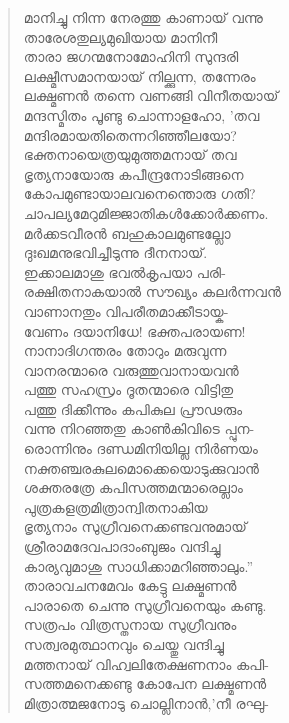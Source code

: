 \begin{verse}
മാനിച്ചു നിന്ന നേരത്തു കാണായ് വന്നു\\
താരേശതുല്യമുഖിയായ മാനിനീ\\
താരാ ജഗന്മനോമോഹിനി സുന്ദരി\\
ലക്ഷ്മീസമാനയായ് നില്ക്കുന്ന, തന്നേരം\\
ലക്ഷ്മണന്‍ തന്നെ വണങ്ങി വിനീതയായ്\\
മന്ദസ്മിതം പൂണ്ടു ചൊന്നാളഹോ, ’തവ\\
മന്ദിരമായതിതെന്നറിഞ്ഞീലയോ?\\
ഭക്തനായെത്രയുമുത്തമനായ് തവ\\
ഭൃത്യനായോരു കപീന്ദ്രനോടിങ്ങനെ\\
കോപമുണ്ടായാലവനെന്തൊരു ഗതി?\\
ചാപല്യമേറുമിജ്ജാതികള്‍ക്കോര്‍ക്കണം.\\
മര്‍ക്കടവീരന്‍ ബഹുകാലമുണ്ടല്ലോ\\
ദുഃഖമനുഭവിച്ചീടുന്നു ദീനനായ്.\\
ഇക്കാലമാശു ഭവല്‍കൃപയാ പരി-\\
രക്ഷിതനാകയാല്‍ സൗഖ്യം കലര്‍ന്നവന്‍\\
വാണാനതും വിപരീതമാക്കീടായ്ക-\\
വേണം ദയാനിധേ! ഭക്തപരായണ!\\
നാനാദിഗന്തരം തോറും മരുവുന്ന\\
വാനരന്മാരെ വരുത്തുവാനായവന്‍\\
പത്തു സഹസ്രം ദൂതന്മാരെ വിട്ടിതു\\
പത്തു ദിക്കീന്നും കപികുല പ്രൗഢരും\\
വന്നു നിറഞ്ഞതു കാണ്‍കിവിടെ പ്പുന-\\
രൊന്നിനും ദണ്ഡമിനിയില്ല നിര്‍ണയം\\
നക്തഞ്ചരകുലമൊക്കെയൊടുക്കുവാന്‍\\
ശക്തരത്രേ കപിസത്തമന്മാരെല്ലാം\\
പുത്രകളത്രമിത്രാന്വിതനാകിയ\\
ഭൃത്യനാം സുഗ്രീവനെക്കണ്ടവനുമായ്\\
ശ്രീരാമദേവപാദാംബുജം വന്ദിച്ചു\\
കാര്യവുമാശു സാധിക്കാമറിഞ്ഞാലും.”\\
താരാവചനമേവം കേട്ടു ലക്ഷ്മണന്‍\\
പാരാതെ ചെന്നു സുഗ്രീവനെയും കണ്ടു.\\
സത്രപം വിത്രസ്തനായ സുഗ്രീവനും\\
സത്വരമുത്ഥാനവും ചെയ്തു വന്ദിച്ചു\\
മത്തനായ് വിഹ്വലിതേക്ഷണനാം കപി-\\
സത്തമനെക്കണ്ടു കോപേന ലക്ഷ്മണന്‍\\
മിത്രാത്മജനോടു ചൊല്ലിനാന്‍,’നീ രഘു-\\

\end{verse}
